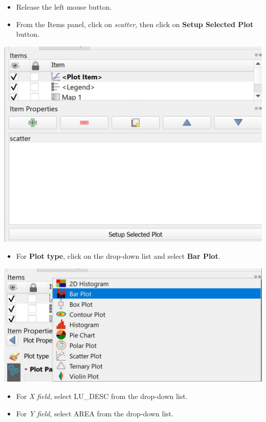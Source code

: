 \documentclass[
  letterpaper,
  DIV=11,
  numbers=noendperiod]{scrreprt}
\providecommand{\tightlist}{%
  \setlength{\itemsep}{0pt}\setlength{\parskip}{0pt}}\usepackage{longtable,booktabs,array}
\begin{document}
\begin{itemize}
\item
  Release the left mouse button.
\item
  From the Items panel, click on \emph{scatter,} then click on
  \textbf{Setup Selected Plot} button.
\end{itemize}

\includegraphics{./img04/image68.jpg}

\begin{itemize}
\tightlist
\item
  For \textbf{Plot type}, click on the drop-down list and select
  \textbf{Bar Plot}.
\end{itemize}

\includegraphics{./img04/image69.jpg}

\begin{itemize}
\item
  For \emph{X field,} select LU\_DESC from the drop-down list.
\item
  For \emph{Y field}, select AREA from the drop-down list.
\end{itemize}
\end{document}

